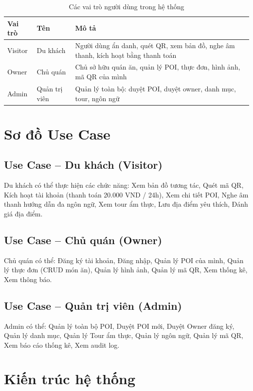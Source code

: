 \documentclass[a4paper,13pt]{report}
\begin{document}
\begin{table}[H]
\centering
\caption{Các vai trò người dùng trong hệ thống}
\begin{tabularx}{\textwidth}{|l|l|X|}
\hline
\textbf{Vai trò} & \textbf{Tên} & \textbf{Mô tả} \\
\hline
Visitor & Du khách & Người dùng ẩn danh, quét QR, xem bản đồ, nghe âm thanh, kích hoạt bằng thanh toán \\
\hline
Owner & Chủ quán & Chủ sở hữu quán ăn, quản lý POI, thực đơn, hình ảnh, mã QR của mình \\
\hline
Admin & Quản trị viên & Quản lý toàn bộ: duyệt POI, duyệt owner, danh mục, tour, ngôn ngữ \\
\hline
\end{tabularx}
\end{table}

\section{Sơ đồ Use Case}

\subsection{Use Case -- Du khách (Visitor)}

Du khách có thể thực hiện các chức năng: Xem bản đồ tương tác, Quét mã QR, Kích hoạt tài khoản (thanh toán 20.000 VND / 24h), Xem chi tiết POI, Nghe âm thanh hướng dẫn đa ngôn ngữ, Xem tour ẩm thực, Lưu địa điểm yêu thích, Đánh giá địa điểm.

\subsection{Use Case -- Chủ quán (Owner)}

Chủ quán có thể: Đăng ký tài khoản, Đăng nhập, Quản lý POI của mình, Quản lý thực đơn (CRUD món ăn), Quản lý hình ảnh, Quản lý mã QR, Xem thống kê, Xem thông báo.

\subsection{Use Case -- Quản trị viên (Admin)}

Admin có thể: Quản lý toàn bộ POI, Duyệt POI mới, Duyệt Owner đăng ký, Quản lý danh mục, Quản lý Tour ẩm thực, Quản lý ngôn ngữ, Quản lý mã QR, Xem báo cáo thống kê, Xem audit log.

\section{Kiến trúc hệ thống}
\end{document}
